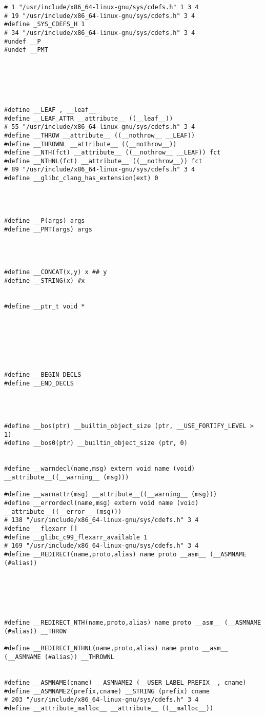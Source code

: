 \documentclass[11pt]{article}
\begin{document}
\begin{enumerate}
\begin{verbatim}
# 1 "/usr/include/x86_64-linux-gnu/sys/cdefs.h" 1 3 4
# 19 "/usr/include/x86_64-linux-gnu/sys/cdefs.h" 3 4
#define _SYS_CDEFS_H 1
# 34 "/usr/include/x86_64-linux-gnu/sys/cdefs.h" 3 4
#undef __P
#undef __PMT






#define __LEAF , __leaf__
#define __LEAF_ATTR __attribute__ ((__leaf__))
# 55 "/usr/include/x86_64-linux-gnu/sys/cdefs.h" 3 4
#define __THROW __attribute__ ((__nothrow__ __LEAF))
#define __THROWNL __attribute__ ((__nothrow__))
#define __NTH(fct) __attribute__ ((__nothrow__ __LEAF)) fct
#define __NTHNL(fct) __attribute__ ((__nothrow__)) fct
# 89 "/usr/include/x86_64-linux-gnu/sys/cdefs.h" 3 4
#define __glibc_clang_has_extension(ext) 0




#define __P(args) args
#define __PMT(args) args




#define __CONCAT(x,y) x ## y
#define __STRING(x) #x


#define __ptr_t void *







#define __BEGIN_DECLS 
#define __END_DECLS 




#define __bos(ptr) __builtin_object_size (ptr, __USE_FORTIFY_LEVEL > 1)
#define __bos0(ptr) __builtin_object_size (ptr, 0)


#define __warndecl(name,msg) extern void name (void) __attribute__((__warning__ (msg)))

#define __warnattr(msg) __attribute__((__warning__ (msg)))
#define __errordecl(name,msg) extern void name (void) __attribute__((__error__ (msg)))
# 138 "/usr/include/x86_64-linux-gnu/sys/cdefs.h" 3 4
#define __flexarr []
#define __glibc_c99_flexarr_available 1
# 169 "/usr/include/x86_64-linux-gnu/sys/cdefs.h" 3 4
#define __REDIRECT(name,proto,alias) name proto __asm__ (__ASMNAME (#alias))






#define __REDIRECT_NTH(name,proto,alias) name proto __asm__ (__ASMNAME (#alias)) __THROW

#define __REDIRECT_NTHNL(name,proto,alias) name proto __asm__ (__ASMNAME (#alias)) __THROWNL


#define __ASMNAME(cname) __ASMNAME2 (__USER_LABEL_PREFIX__, cname)
#define __ASMNAME2(prefix,cname) __STRING (prefix) cname
# 203 "/usr/include/x86_64-linux-gnu/sys/cdefs.h" 3 4
#define __attribute_malloc__ __attribute__ ((__malloc__))








\end{verbatim}
\end{enumerate}
\end{document}
